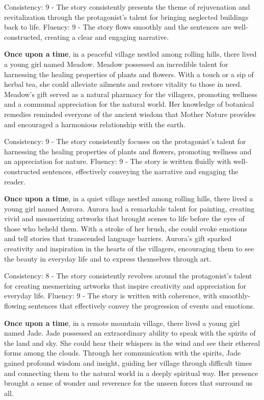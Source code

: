\documentclass{article}
\begin{document}
Consistency: 9 - The story consistently presents the theme of rejuvenation and revitalization through the protagonist's talent for bringing neglected buildings back to life.
Fluency: 9 - The story flows smoothly and the sentences are well-constructed, creating a clear and engaging narrative.

\textbf{Once upon a time}, in a peaceful village nestled among rolling hills, there lived a young girl named Meadow. Meadow possessed an incredible talent for harnessing the healing properties of plants and flowers. With a touch or a sip of herbal tea, she could alleviate ailments and restore vitality to those in need. Meadow's gift served as a natural pharmacy for the villagers, promoting wellness and a communal appreciation for the natural world. Her knowledge of botanical remedies reminded everyone of the ancient wisdom that Mother Nature provides and encouraged a harmonious relationship with the earth.

Consistency: 9 - The story consistently focuses on the protagonist's talent for harnessing the healing properties of plants and flowers, promoting wellness and an appreciation for nature.
Fluency: 9 - The story is written fluidly with well-constructed sentences, effectively conveying the narrative and engaging the reader.

\textbf{Once upon a time}, in a quiet village nestled among rolling hills, there lived a young girl named Aurora. Aurora had a remarkable talent for painting, creating vivid and mesmerizing artworks that brought scenes to life before the eyes of those who beheld them. With a stroke of her brush, she could evoke emotions and tell stories that transcended language barriers. Aurora's gift sparked creativity and inspiration in the hearts of the villagers, encouraging them to see the beauty in everyday life and to express themselves through art.

Consistency: 8 - The story consistently revolves around the protagonist's talent for creating mesmerizing artworks that inspire creativity and appreciation for everyday life.
Fluency: 9 - The story is written with coherence, with smoothly-flowing sentences that effectively convey the progression of events and emotions.

\textbf{Once upon a time}, in a remote mountain village, there lived a young girl named Jade. Jade possessed an extraordinary ability to speak with the spirits of the land and sky. She could hear their whispers in the wind and see their ethereal forms among the clouds. Through her communication with the spirits, Jade gained profound wisdom and insight, guiding her village through difficult times and connecting them to the natural world in a deeply spiritual way. Her presence brought a sense of wonder and reverence for the unseen forces that surround us all.
\end{document}
